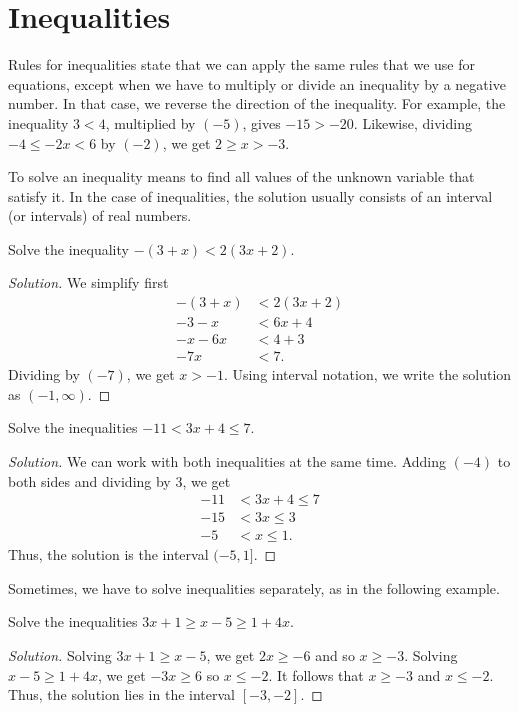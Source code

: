 \documentclass{ximera}
\begin{document}
\section{Inequalities}

Rules for inequalities state that we can apply the same rules that we use for equations, except when we have to multiply or divide an inequality by a negative number.  In that case, we reverse the direction of the inequality.  For example, the inequality $3<4$, multiplied by $(-5)$, gives $-15 > -20$.  Likewise, dividing $-4 \leq -2x < 6$ by $(-2)$, we get $2 \geq x > -3$.

To solve an inequality means to find all values of the unknown variable that satisfy it.  In the case of inequalities, the solution usually consists of an interval (or intervals) of real numbers.

\begin{example}
Solve the inequality $-(3+x) < 2(3x+2)$.
\end{example}
\begin{proof}[Solution]

We simplify first
\begin{align*}
	-(3+x) &< 2(3x+2) \\
	-3-x &< 6x+4\\
	-x-6x &< 4+3\\
	-7x &< 7.
\end{align*}
Dividing by $(-7)$, we get $x > -1$.  Using interval notation, we write the solution as $(-1, \infty)$.
\end{proof}

\begin{example}
Solve the inequalities $-11 < 3x+4 \leq 7$.
\end{example}
\begin{proof}[Solution]

We can work with both inequalities at the same time.  Adding $(-4)$ to both sides and dividing by $3$, we get
\begin{align*}
	-11 &< 3x+4 \leq 7\\
	-15 &< 3x \leq 3\\
	-5 &< x \leq 1.
\end{align*}
Thus, the solution is the interval $(-5, 1]$.
\end{proof}

Sometimes, we have to solve inequalities separately, as in the following example.

\begin{example}
Solve the inequalities $3x+1 \geq x-5 \geq 1+4x$.
\end{example}
\begin{proof}[Solution]

Solving $3x+1 \geq x-5$, we get $2x \geq -6$ and so $x \geq -3$.  Solving $x-5 \geq 1+4x$, we get $-3x \geq 6$ so $x \leq -2$.  It follows that
$x \geq -3$ and $x \leq -2$.  Thus, the solution lies in the interval $[-3, -2]$.
\end{proof}
\end{document}
